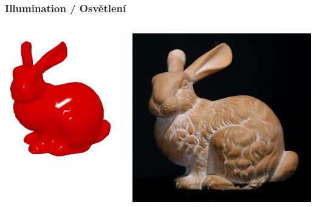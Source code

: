 \begin{frame}
    \frametitle{Illumination / Osvětlení}

    \begin{columns}[c]

    \includegraphics[width=\textwidth]{pics/physicallyBasedRendering/bunny}


    \includegraphics[width=\textwidth]{pics/physicallyBasedRendering/stanford-bunny}
    
    \end{columns}
\end{frame}

